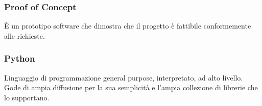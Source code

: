 \subsubsection*{Proof of Concept}
È un prototipo software che dimostra che il progetto è fattibile conformemente alle richieste.

\subsubsection*{Python}
Linguaggio di programmazione general purpose, interpretato, ad alto livello. Gode di ampia diffusione per la sua semplicità e l'ampia collezione di librerie che lo supportano.

